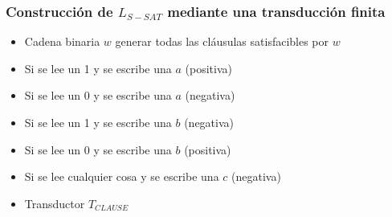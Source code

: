 \documentclass{beamer}
\begin{document}
\begin{frame}

    \frametitle{Construcción de $L_{S-SAT}$ mediante una transducción finita}
    
    \begin{itemize}
        \item Cadena binaria $w$ generar todas las cláusulas satisfacibles por $w$
              \pause
        \item Si se lee un 1 y se escribe una $a$ (positiva)
              \pause
        \item Si se lee un 0 y se escribe una $a$ (negativa)
              \pause
        \item Si se lee un 1 y se escribe una $b$ (negativa)
              \pause
        \item Si se lee un 0 y se escribe una $b$ (positiva)
              \pause
        \item Si se lee cualquier cosa y se escribe una $c$ (negativa)
              \pause
        \item Transductor $T_{CLAUSE}$
    \end{itemize}
    
\end{frame}
\end{document}
